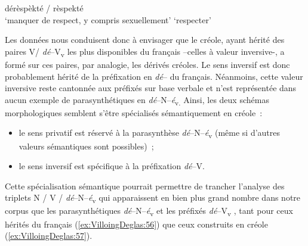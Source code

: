 \documentclass[output=paper]{langsci/langscibook}
\begin{document}
\ea \label{ex:VilloingDeglas:55}
 \gll dérèspèkté / rèspekté\\
 {`manquer de respect, y compris sexuellement'} {}   `respecter'\\
\z

Les données nous conduisent donc à envisager que le créole, ayant hérité
des paires V/ \emph{dé}--V\textsubscript{v} les plus disponibles du français
--celles à valeur inversive-, a formé sur ces paires, par analogie, les
dérivés créoles. Le sens inversif est donc probablement hérité de la
préfixation en \emph{dé}-- du français. Néanmoins, cette valeur inversive
reste cantonnée aux préfixés sur base verbale et n'est représentée dans
aucun exemple de parasynthétiques en \emph{dé}--N--\emph{é}\textsubscript{v.} Ainsi, les
deux schémas morphologiques semblent s'être spécialisés sémantiquement
en créole~:

\begin{itemize}

\item
  le sens privatif est réservé à la parasynthèse \emph{dé}--N--\emph{é}\textsubscript{v}
  (même si d'autres valeurs sémantiques sont possibles)~;
\item
  le sens inversif est spécifique à la préfixation \emph{dé}--V.
\end{itemize}

Cette spécialisation sémantique pourrait permettre de trancher l'analyse
des triplets N / V / \emph{dé}--N--\emph{é}\textsubscript{v} qui apparaissent en bien
plus grand nombre dans notre corpus que les parasynthétiques
\emph{dé}--N--\emph{é}\textsubscript{v} et les préfixés \emph{dé}--V\textsubscript{v} , tant
pour ceux hérités du français (\ref{ex:VilloingDeglas:56}) que ceux construits en créole (\ref{ex:VilloingDeglas:57}).
\end{document}
